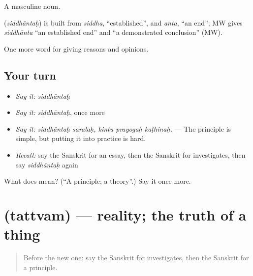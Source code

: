 A masculine noun.

\begin{cousinweb}
\textbf{} (\emph{siddhāntaḥ}) is built from \emph{siddha}, \textquotedblleft{}established\textquotedblright{}, and \emph{anta}, \textquotedblleft{}an end\textquotedblright{}; MW gives \emph{siddhānta} \textquotedblleft{}an established end\textquotedblright{} and \textquotedblleft{}a demonstrated conclusion\textquotedblright{} (MW).
\end{cousinweb}

\begin{grammarlens}[title={What you've built}]
One more word for giving reasons and opinions.
\end{grammarlens}

\subsection*{Your turn}
\begin{itemize}
\raggedright
  \item \emph{Say it:} \emph{siddhāntaḥ}
  \item \emph{Say it:} \emph{siddhāntaḥ}, once more
  \item \emph{Say it:} \emph{siddhāntaḥ saralaḥ, kintu prayogaḥ kaṭhinaḥ.} — The principle is simple, but putting it into practice is hard.
  \item \emph{Recall:} say the Sanskrit for an essay, then the Sanskrit for investigates, then say \emph{siddhāntaḥ} again
\end{itemize}

\begin{tcolorbox}[breakable,colback=teal!4,colframe=teal!35!black,title={Before you move on}]
What does  mean? (\textquotedblleft{}A principle; a theory\textquotedblright{}.) Say it once more.
\end{tcolorbox}
\section[\texorpdfstring{\sk{तत्त्वम्} (tattvam)}{तत्त्वम् (tattvam)}]{ (tattvam) — reality; the truth of a thing}

\label{lesson:SA-C365-tattvam}



\begin{quote}
Before the new one: say the Sanskrit for investigates, then the Sanskrit for a principle.
\end{quote}

